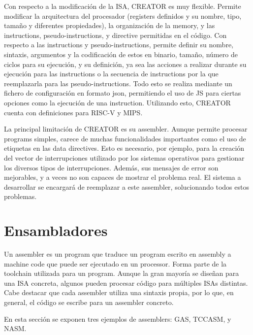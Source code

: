 Con respecto a la modificación de la \gls{ISA}, CREATOR es muy flexible. Permite
modificar la arquitectura del procesador (\glspl{register} definidos y su
nombre, tipo, tamaño y diferentes propiedades), la organización de la
\gls{memory}, y las \glspl{instruction}, \glspl{pseudo-instruction}, y
\gls{directive} permitidas en el código. Con respecto a las \glspl{instruction}
y \glspl{pseudo-instruction}, permite definir su nombre, sintaxis, argumentos y
la codificación de estos en binario, tamaño, número de ciclos para su ejecución,
y su definición, ya sea las acciones a realizar durante su ejecución para las
\glspl{instruction} o la secuencia de \glspl{instruction} por la que
reemplazarla para las \glspl{pseudo-instruction}. Todo esto se realiza mediante
un fichero de configuración en formato \gls{json}, permitiendo el uso de
\gls{JS} para ciertas opciones como la ejecución de una \gls{instruction}.
Utilizando esto, CREATOR cuenta con definiciones para RISC-V y MIPS.

La principal limitación de CREATOR es su \gls{assembler}. Aunque permite
procesar \glspl{program} simples, carece de muchas funcionalidades importantes
como el uso de etiquetas en las \glspl{data directive}. Esto es necesario, por
ejemplo, para la creación del vector de interrupciones utilizado por los
sistemas operativos para gestionar los diversos tipos de interrupciones. Además,
sus mensajes de error son mejorables, y a veces no son capaces de mostrar el
problema real. El sistema a desarrollar se encargará de reemplazar a este
\gls{assembler}, solucionando todos estos problemas.


\section{Ensambladores}

Un \gls{assembler} es un \gls{program} que traduce un \gls{program} escrito en
\gls{assembly} a \gls{machine code} que puede ser ejecutado en un
\gls{processor}. Forma parte de la \gls{toolchain} utilizada para
 un \gls{program}. Aunque la gran mayoría se
diseñan para una \gls{ISA} concreta, algunos pueden procesar código para
múltiples \glspl{ISA} distintas. Cabe destacar que cada \gls{assembler} utiliza
una sintaxis propia, por lo que, en general, el código se escribe para un
\gls{assembler} concreto.

En esta sección se exponen tres ejemplos de \glspl{assembler}: GAS, TCCASM, y NASM.

